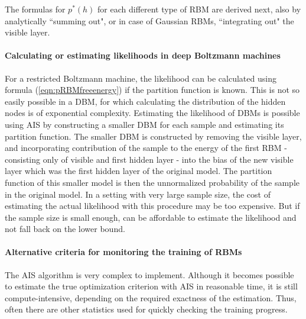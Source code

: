 \documentclass[12pt]{article}
\begin{document}
The formulas for $p^*(h)$ for each different type of RBM are derived next, also by analytically ``summing out", or in case of Gaussian RBMs, ``integrating out" the visible layer.


\paragraph{Calculating or estimating likelihoods in deep Boltzmann machines}
For a restricted Boltzmann machine, the likelihood can be calculated using formula (\ref{eqn:pRBMfreeenergy}) if the partition function is known. This is not so easily possible in a DBM, for which calculating the distribution of the hidden nodes is of exponential complexity.
Estimating the likelihood of DBMs is possible using AIS by constructing a smaller DBM for each sample and estimating its partition function.
The smaller DBM is constructed by removing the visible layer, and incorporating contribution of the sample to the energy of the first RBM - consisting only of visible and first hidden layer - into the bias of the new visible layer which was the first hidden layer of the original model.
The partition function of this smaller model is then the unnormalized probability of the sample in the original model.
In a setting with very large sample size, the cost of estimating the actual likelihood with this procedure may be too expensive. But if the sample size is small enough, can be affordable to estimate the likelihood and not fall back on the lower bound.

\paragraph{Alternative criteria for monitoring the training of RBMs}
The AIS algorithm is very complex to implement.
Although it becomes possible to estimate the true optimization criterion with AIS in reasonable time, it is still compute-intensive, depending on the required exactness of the estimation.
Thus, often there are other statistics used for quickly checking the training progress.
\end{document}
